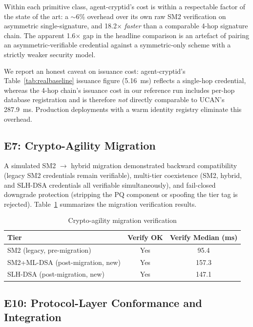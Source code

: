 \documentclass[10pt,twocolumn]{IEEEtran}
\begin{document}
Within each primitive class, agent-cryptid's cost is within a
respectable factor of the state of the art: a $\sim$6\% overhead over
its own raw SM2 verification on asymmetric single-signature, and
18.2$\times$ \emph{faster} than a comparable 4-hop signature chain.
The apparent 1.6$\times$ gap in the
headline comparison is an artefact of pairing an asymmetric-verifiable
credential against a symmetric-only scheme with a strictly weaker
security model.

We report an honest caveat on issuance cost: agent-cryptid's
Table~\ref{tab:realbaseline} issuance figure (5.16~ms) reflects a
single-hop credential, whereas the 4-hop chain's issuance cost in our
reference run includes per-hop database registration and is therefore
\emph{not} directly comparable to UCAN's 287.9~ms. Production
deployments with a warm identity registry eliminate this overhead.

\subsection{E7: Crypto-Agility Migration}

A simulated SM2 $\rightarrow$ hybrid migration demonstrated backward
compatibility (legacy SM2 credentials remain verifiable), multi-tier
coexistence (SM2, hybrid, and SLH-DSA credentials all verifiable
simultaneously), and fail-closed downgrade protection (stripping the PQ
component or spoofing the tier tag is rejected). Table~\ref{tab:migration}
summarizes the migration verification results.

\begin{table}[t]
  \caption{Crypto-agility migration verification}
  \label{tab:migration}
  \centering\small
  \begin{tabular}{lcc}
    \toprule
    \textbf{Tier} & \textbf{Verify OK} & \textbf{Verify Median (ms)} \\
    \midrule
    SM2 (legacy, pre-migration) & Yes & 95.4 \\
    SM2+ML-DSA (post-migration, new) & Yes & 157.3 \\
    SLH-DSA (post-migration, new) & Yes & 147.1 \\
    \bottomrule
  \end{tabular}
\end{table}

\subsection{E10: Protocol-Layer Conformance and Integration}
\label{sec:e10}
\end{document}
